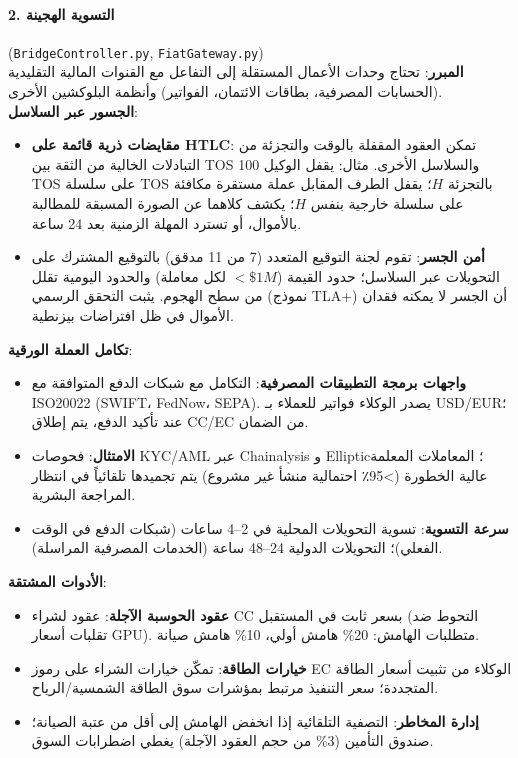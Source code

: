\documentclass[11pt]{article}
\begin{document}
\paragraph{2. التسوية الهجينة} (\texttt{BridgeController.py}, \texttt{FiatGateway.py})\\
\textbf{المبرر}: تحتاج وحدات الأعمال المستقلة إلى التفاعل مع القنوات المالية التقليدية (الحسابات المصرفية، بطاقات الائتمان، الفواتير) وأنظمة البلوكشين الأخرى.\\
\textbf{الجسور عبر السلاسل}:
\begin{itemize}[noitemsep]
  \item \textbf{مقايضات ذرية قائمة على HTLC}: تمكن العقود المقفلة بالوقت والتجزئة من التبادلات الخالية من الثقة بين TOS والسلاسل الأخرى. مثال: يقفل الوكيل 100 TOS على سلسلة TOS بالتجزئة $H$؛ يقفل الطرف المقابل عملة مستقرة مكافئة على سلسلة خارجية بنفس $H$؛ يكشف كلاهما عن الصورة المسبقة للمطالبة بالأموال، أو تسترد المهلة الزمنية بعد 24 ساعة.
  \item \textbf{أمن الجسر}: تقوم لجنة التوقيع المتعدد (7 من 11 مدقق) بالتوقيع المشترك على التحويلات عبر السلاسل؛ حدود القيمة ($<\$1M$ لكل معاملة) والحدود اليومية تقلل من سطح الهجوم. يثبت التحقق الرسمي (نموذج TLA+) أن الجسر لا يمكنه فقدان الأموال في ظل افتراضات بيزنطية.
\end{itemize}
\textbf{تكامل العملة الورقية}:
\begin{itemize}[noitemsep]
  \item \textbf{واجهات برمجة التطبيقات المصرفية}: التكامل مع شبكات الدفع المتوافقة مع ISO20022 (SWIFT، FedNow، SEPA). يصدر الوكلاء فواتير للعملاء بـ USD/EUR؛ عند تأكيد الدفع، يتم إطلاق CC/EC من الضمان.
  \item \textbf{الامتثال}: فحوصات KYC/AML عبر Chainalysis و Elliptic؛ المعاملات المعلمة عالية الخطورة (>95٪ احتمالية منشأ غير مشروع) يتم تجميدها تلقائياً في انتظار المراجعة البشرية.
  \item \textbf{سرعة التسوية}: تسوية التحويلات المحلية في 2--4 ساعات (شبكات الدفع في الوقت الفعلي)؛ التحويلات الدولية 24--48 ساعة (الخدمات المصرفية المراسلة).
\end{itemize}
\textbf{الأدوات المشتقة}:
\begin{itemize}[noitemsep]
  \item \textbf{عقود الحوسبة الآجلة}: عقود لشراء CC بسعر ثابت في المستقبل (التحوط ضد تقلبات أسعار GPU). متطلبات الهامش: 20\% هامش أولي، 10\% هامش صيانة.
  \item \textbf{خيارات الطاقة}: تمكّن خيارات الشراء على رموز EC الوكلاء من تثبيت أسعار الطاقة المتجددة؛ سعر التنفيذ مرتبط بمؤشرات سوق الطاقة الشمسية/الرياح.
  \item \textbf{إدارة المخاطر}: التصفية التلقائية إذا انخفض الهامش إلى أقل من عتبة الصيانة؛ صندوق التأمين (3\% من حجم العقود الآجلة) يغطي اضطرابات السوق.
\end{itemize}
\end{document}
